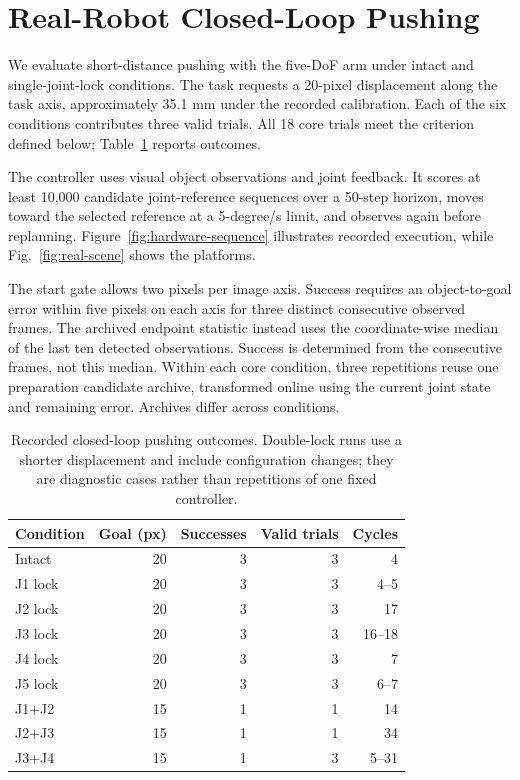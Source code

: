 \documentclass[conference]{IEEEtran}
\begin{document}
\section{Real-Robot Closed-Loop Pushing}
We evaluate short-distance pushing with the five-DoF arm under intact and single-joint-lock conditions. The task requests a 20-pixel displacement along the task axis, approximately 35.1 mm under the recorded calibration. Each of the six conditions contributes three valid trials. All 18 core trials meet the criterion defined below; Table~\ref{tab:real-push} reports outcomes.

The controller uses visual object observations and joint feedback. It scores at least 10,000 candidate joint-reference sequences over a 50-step horizon, moves toward the selected reference at a 5-degree/s limit, and observes again before replanning. Figure~\ref{fig:hardware-sequence} illustrates recorded execution, while Fig.~\ref{fig:real-scene} shows the platforms.

The start gate allows two pixels per image axis. Success requires an object-to-goal error within five pixels on each axis for three distinct consecutive observed frames. The archived endpoint statistic instead uses the coordinate-wise median of the last ten detected observations. Success is determined from the consecutive frames, not this median. Within each core condition, three repetitions reuse one preparation candidate archive, transformed online using the current joint state and remaining error. Archives differ across conditions.

\begin{table}[t]\centering
\caption{Recorded closed-loop pushing outcomes. Double-lock runs use a
shorter displacement and include configuration changes; they are diagnostic
cases rather than repetitions of one fixed controller.}
\label{tab:real-push}
\begin{tabular}{lrrrr}\toprule
Condition & Goal (px) & Successes & Valid trials & Cycles\\\midrule
Intact &20&3&3&4\\
J1 lock &20&3&3&4--5\\
J2 lock &20&3&3&17\\
J3 lock &20&3&3&16--18\\
J4 lock &20&3&3&7\\
J5 lock &20&3&3&6--7\\\midrule
J1+J2 &15&1&1&14\\
J2+J3 &15&1&1&34\\
J3+J4 &15&1&3&5--31\\\bottomrule
\end{tabular}
\end{table}
\end{document}
